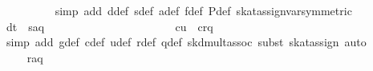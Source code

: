 \begin{isabellebody}
\ \ \ \ \ \ \ \ \isamarkupfalse%
\ {}simp\ add{}\ d{}def\ s{}def\ a{}def\ f{}def\ P{}def\ skat{}assign{}{}var{}symmetric{}{}\isanewline
\ \ \ \ \ \ \isamarkupfalse%
\ \isamarkupfalse%
\ {}d{}t{}\ {}\ s{}{}a{}{}q{}{}{}{}\ \isamarkupfalse%
\isanewline
\ \ \ \ \isamarkupfalse%
\isanewline
\ \ \ \ \isamarkupfalse%
\isanewline
\ \ \ \ \isamarkupfalse%
\isanewline
\ \ \ \ \ \ \isamarkupfalse%
\ {}c{}{}u{}{}{}\ {}\ c{}{}r{}{}{}q{}{}{}{}\isanewline
\ \ \ \ \ \ \ \ \isamarkupfalse%
\ {}simp\ add{}\ g{}def\ c{}def\ u{}def\ r{}def\ q{}def\ skd{}mult{}assoc{}\ subst\ skat{}assign{}{}\ auto{}\isanewline
\ \ \ \ \ \ \isamarkupfalse%
\ \isamarkupfalse%
\ {}{}{}{}\ {}\ r{}{}{}a{}{}q{}{}{}{}\isanewline

\end{isabellebody}
